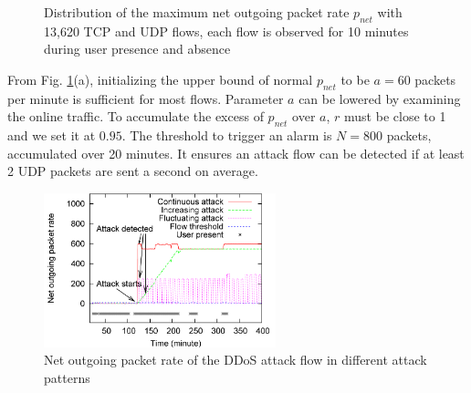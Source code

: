 \begin{figure}[htb]
\centering {}
\caption{Distribution of the maximum net outgoing
packet rate $p_{net}$ with 13,620 TCP and UDP flows, each flow is
observed for 10 minutes during user presence and absence}
\label{fig:ddos}
\end{figure}

From Fig. \ref{fig:ddos}(a), initializing the upper bound of normal
$p_{net}$ to be $a=60$ packets per minute is sufficient for most
flows. Parameter $a$ can be lowered by examining the online traffic. To
accumulate the excess of $p_{net}$ over $a$, $r$ must be close to 1
and we set it at $0.95$. The threshold to trigger an alarm is
$N=800$ packets, accumulated over 20 minutes. It ensures an attack
flow can be detected if at least 2 UDP packets are sent a second on
average.

\begin{figure}[htb]
\centering
\includegraphics[width=0.6\textwidth]{sensor/ddos-atkflow.png}
\caption{Net outgoing packet rate of the DDoS attack flow in
different attack patterns}
\label{fig:ddos-atkflow}
\end{figure}

